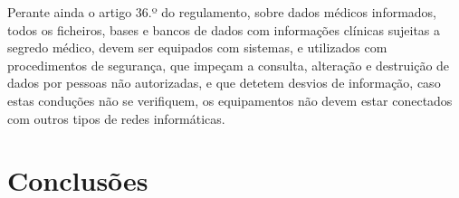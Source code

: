 \documentclass[conference]{IEEEtran}
\begin{document}
Perante ainda o artigo 36.º do regulamento, sobre dados médicos informados, todos os ficheiros, bases e bancos de dados com informações clínicas sujeitas a segredo médico, devem ser equipados com sistemas, e utilizados com procedimentos de segurança, que impeçam a consulta, alteração e destruição de dados por pessoas não autorizadas, e que detetem desvios de informação, caso estas conduções não se verifiquem, os equipamentos não devem estar conectados com outros tipos de redes informáticas.



\section{Conclusões}




\end{document}
